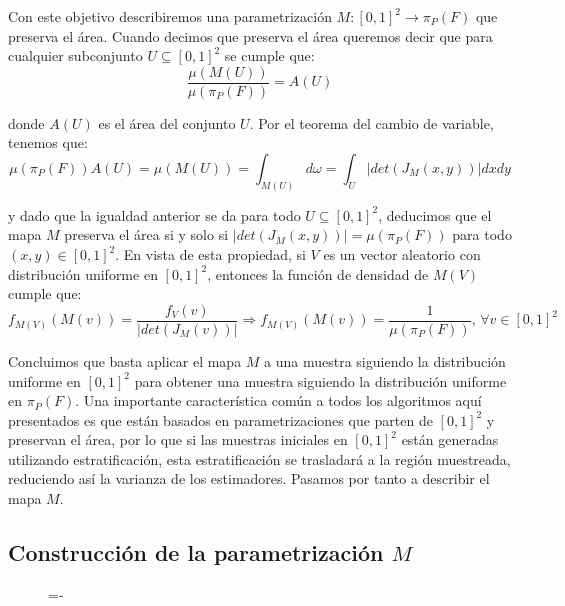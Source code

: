 Con este objetivo describiremos una parametrización $M:[0,1]^2\rightarrow \pi_P(F)$ que preserva el área. Cuando decimos que preserva el área queremos decir que para cualquier subconjunto $U\subseteq [0,1]^2$ se cumple que:
$$\frac{\mu(M(U))}{\mu(\pi_P(F))} = A(U)$$

donde $A(U)$ es el área del conjunto $U$. Por el teorema del cambio de variable, tenemos que:
$$\mu(\pi_P(F))A(U) = \mu(M(U)) = \int_{M(U)}d\omega = \int_{U}|det(J_M(x,y))| dxdy $$

y dado que la igualdad anterior se da para todo $U\subseteq [0,1]^2$, deducimos que el mapa $M$ preserva el área si y solo si $|det(J_M(x,y))| = \mu(\pi_P(F))$ para todo $(x,y)\in[0,1]^2$. En vista de esta propiedad, si $V$ es un vector aleatorio con distribución uniforme en $[0,1]^2$, entonces la función de densidad de $M(V)$ cumple que:
$$f_{M(V)}(M(v)) = \frac{f_V(v)}{|det(J_M(v))|}\Rightarrow f_{M(V)}(M(v)) =\frac{1}{\mu(\pi_P(F))} \text{, }\forall v\in [0,1]^2$$

Concluimos que basta aplicar el mapa $M$ a una muestra siguiendo la distribución uniforme en $[0,1]^2$ para obtener una muestra siguiendo la distribución uniforme en $\pi_P(F)$.  Una importante característica común a todos los algoritmos aquí presentados es que están basados en parametrizaciones que parten de $[0,1]^2$ y preservan el área, por lo que si las muestras iniciales en $[0,1]^2$ están generadas utilizando estratificación, esta estratificación se trasladará a la región muestreada, reduciendo así la varianza de los estimadores. Pasamos por tanto a describir el mapa $M$.

\subsection{Construcción de la parametrización $M$ }

\begin{figure}[h]
  \lineskip=-\fboxrule
\end{figure}


